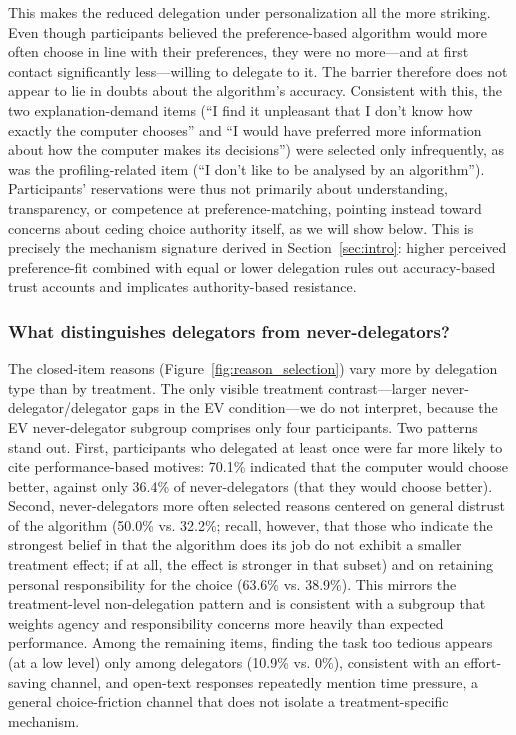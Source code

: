 \documentclass[a4paper, 12pt, fleqn]{article}
\theoremstyle{definition}
\newcommand{\inew}[1]{{\color{blue} #1\color{black}}}
\begin{document}
This makes the reduced delegation under personalization all the more striking. Even though participants believed the preference-based algorithm would more often choose in line with their preferences, they were no more---and at first contact significantly less---willing to delegate to it. The barrier therefore does not appear to lie in doubts about the algorithm's accuracy. Consistent with this, the two explanation-demand items (``I find it unpleasant that I don't know how exactly the computer chooses'' and ``I would have preferred more information about how the computer makes its decisions'') were selected only infrequently, as was the profiling-related item (``I don't like to be analysed by an algorithm''). Participants' reservations were thus not primarily about understanding, transparency, or competence at preference-matching, pointing instead toward concerns about ceding choice authority itself, as we will show below. \inew{This is precisely the mechanism signature derived in Section~\ref{sec:intro}: higher perceived preference-fit combined with equal or lower delegation rules out accuracy-based trust accounts and implicates authority-based resistance.}

\subsubsection*{What distinguishes delegators from never-delegators?}
The closed-item reasons (Figure~\ref{fig:reason_selection}) vary more by delegation type than by treatment. The only visible treatment contrast---larger never-delegator/delegator gaps in the EV condition---we do not interpret, because the EV never-delegator subgroup comprises only four participants. Two patterns stand out. First, participants who delegated at least once were far more likely to cite performance-based motives: 70.1\% indicated that the computer would choose better, against only 36.4\% of never-delegators (that they would choose better). Second, never-delegators more often selected reasons centered on general distrust of the algorithm (50.0\% vs. 32.2\%; recall, however, that those who indicate the strongest belief in that the algorithm does its job do not exhibit a smaller treatment effect; if at all, the effect is stronger in that subset) and on retaining personal responsibility for the choice (63.6\% vs. 38.9\%). This mirrors the treatment-level non-delegation pattern and is consistent with a subgroup that weights agency and responsibility concerns more heavily than expected performance. Among the remaining items, finding the task too tedious appears (at a low level) only among delegators (10.9\% vs. 0\%), consistent with an effort-saving channel, and open-text responses repeatedly mention time pressure, a general choice-friction channel that does not isolate a treatment-specific mechanism.
\end{document}
